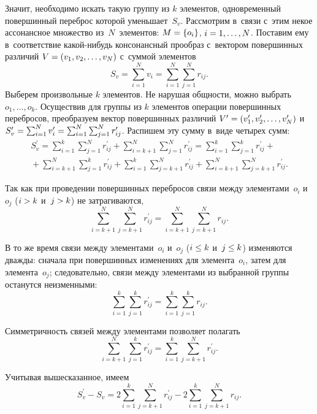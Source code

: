 \begin{multicols}{2}
     Значит, необходимо искать такую группу из $k$ элементов, 
одновременный повершинный переброс которой уменьшает~$S_v$. 
Рас\-смот\-рим в~связи с~этим некое ассонансное множество из~$N$~элементов: 
$M\hm= \{o_i\}$, $i \hm= 1, \ldots , N$. По\-ста\-вим ему в~соответствие  
ка\-кой-ни\-будь консонансный прообраз с~вектором повершинных различий 
$V\hm = (v_1, v_2, \ldots , v_N)$ с~суммой элементов
     $$
     S_v= \sum\limits_{i=1}^N v_i= \sum\limits^N_{i=1} \sum\limits^N_{j=1} 
r_{ij}.
     $$
Выберем произвольные $k$ элементов. Не нарушая общ\-ности, мож\-но 
выбрать $o_1, \ldots , o_k$. Осуществив для группы из $k$ элементов операции 
повершинных перебросов, преобразуем вектор повершинных различий 
$V^\prime \hm= (v_1^\prime, v_2^\prime, \ldots , v_N^\prime)$ и~$S_v^\prime 
\hm= \sum\nolimits^N_{i=1} v_i^\prime\hm= \sum\nolimits^N_{i=1} 
\sum\nolimits^N_{j=1} r^\prime_{ij}$. Распишем эту сумму в~виде четырех 
сумм:
\begin{multline*}
S_v^\prime= \sum\limits_{i=1}^k \sum\limits_{j=1}^N r^\prime_{ij} 
+\sum\limits^N_{i=k+1} \sum\limits^N_{j=1} r^\prime_{ij} =  \sum\limits^k_{i=1} \sum\limits^k_{j=1} r^\prime_{ij} +{}\\
{}+
\sum\limits^N_{i=k+1} \sum\limits^k_{j=1} r^\prime_{ij}+
\sum\limits^k_{i=1} \sum\limits^N_{j=k+1} r^\prime_{ij}+
\sum\limits^N_{i=k+1} \sum\limits^N_{j=k+1} r^\prime_{ij}.
\end{multline*}
     
     Так как при проведении повершинных перебросов связи между 
элементами~$o_i$ и~$o_j$ ($i \hm> k$ и~$j \hm> k$) не затрагиваются, 
     $$
     \sum\limits^N_{i=k+1} \sum\limits^N_{j=k+1} r^\prime_{ij} = 
\sum\limits^N_{i=k+1} \sum\limits_{j=k+1}^N r_{ij}.
     $$
     
     В то же время связи между элементами~$o_i$ и~$o_j$ ($i \hm\leq k$ 
и~$j \hm\leq k$) изменяются дваж\-ды: сначала при повершинных изменениях 
для элемента~$o_i$, затем для элемента~$o_j$; следовательно, связи между 
элементами из выбранной группы останутся неизменными:
     $$
     \sum\limits^k_{i=1} \sum\limits^k_{j=1} r^\prime_{ij} =\sum\limits^k_{i=1} 
\sum\limits^k_{j=1} r_{ij}.
     $$
     
     Симметричность связей между элементами поз\-во\-ля\-ет полагать
     $$
     \sum\limits^N_{i=k+1} \sum\limits^k_{j=1} r^\prime_{ij} 
=\sum\limits^k_{i=1} \sum\limits^N_{j=k+1} r^\prime_{ij}.
     $$
     
     Учитывая вышесказанное, имеем
     $$
     S_v^\prime -S_v= 2\sum\limits^k_{i=1} \sum\limits^N_{j=k+1} 
r^\prime_{ij} -2\sum\limits^k_{i=1} \sum\limits^N_{j=k+1} r_{ij}.
     $$
     

\end{multicols}
